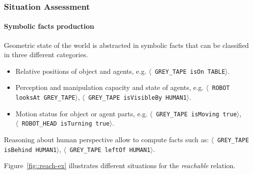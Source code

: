 \documentclass[preprint,3p,times]{elsarticle}
\newcommand{\stmt}[1]{{\footnotesize \tt $\langle$ #1\relax$\rangle$}}
\begin{document}
\begin{table}
\label{table|beliefsfig7}
\end{table}

\subsubsection{Situation Assessment}

\paragraph{Symbolic facts production} 

Geometric state of the world is abstracted in symbolic facts that can
be classified in three different categories.

\begin {itemize}
\item Relative positions of object and agents, e.g.  \stmt{GREY\_TAPE
    isOn TABLE}.

\item Perception and manipulation capacity and state of agents,
  e.g. \stmt{ROBOT looksAt GREY\_TAPE}, \stmt{GREY\_TAPE isVisibleBy
    HUMAN1}.

\item Motion status for object or agent parts, e.g.  \stmt{GREY\_TAPE
    isMoving true},\\ \stmt{ROBOT\_HEAD isTurning true}.
\end {itemize} 

Reasoning about human perspective allow to compute facts such as:
\stmt{GREY\_TAPE isBehind HUMAN1}, \stmt{GREY\_TAPE leftOf
  HUMAN1}.

Figure~\ref{fig::reach-ex} illustrates different situations for the
\textit{reachable} relation.
\end{document}
